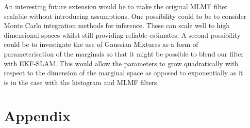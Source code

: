 An interesting future extension would be to make the original MLMF filter scalable without introducing assumptions.
One possibility could to be to consider Monte Carlo integration methods for inference. These can scale well to high dimensional 
spaces whilst still providing reliable estimates. A second possibility could be to investigate the use of Gaussian Mixtures as a 
form of parameterisation of the marginals so that it might be possible to blend our filter with  
EKF-SLAM. This would allow the parameters to grow quadratically with respect to the dimension of the marginal space as opposed to
exponentially as it is in the case with the histogram and MLMF filters.



\section{Appendix}\label{ch5:appendix}



